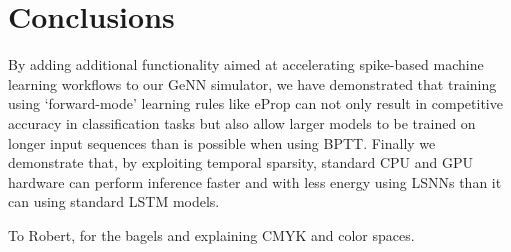 \documentclass[sigconf,authordraft]{acmart}
\begin{document}
\section{Conclusions}
By adding additional functionality aimed at accelerating spike-based machine learning workflows to our GeNN simulator, we have demonstrated that training using `forward-mode' learning rules like eProp can not only result in competitive accuracy in classification tasks but also allow  larger models to be trained on longer input sequences than is possible when using BPTT.
Finally we demonstrate that, by exploiting temporal sparsity, standard CPU and GPU hardware can perform inference faster and with less energy using LSNNs than it can using standard LSTM models.

\begin{acks}
To Robert, for the bagels and explaining CMYK and color spaces.
\end{acks}



\end{document}
